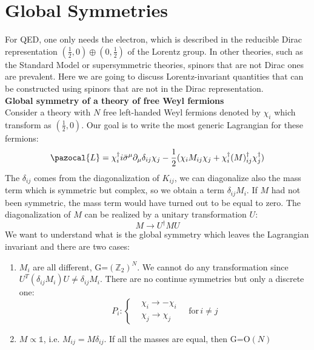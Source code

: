 \documentclass[../main.tex]{subfiles}
\begin{document}
\section{Global Symmetries}
For QED, one only needs the electron, which is described in the reducible Dirac representation $\left(\frac{1}{2},0\right)\oplus\left(0,\frac{1}{2}\right)$ of the Lorentz group. In other theories, such as the Standard Model or supersymmetric theories, spinors that are not Dirac ones are prevalent. Here we are going to discuss Lorentz-invariant quantities that can be constructed using spinors that are not in the Dirac representation.\\
\textbf{Global symmetry of a theory of free Weyl fermions}\\
Consider a theory with $N$ free left-handed Weyl fermions denoted by $\chi_i$ which transform as $\left(\frac{1}{2},0\right)$. Our goal is to write the most generic Lagrangian for these fermions:
\[
\pazocal{L}=\chi_i^\dagger i\bar{\sigma}^\mu\partial_\mu \delta_{ij}\chi_j-\frac{1}{2}(\chi_i M_{ij}\chi_j+\chi_i^\dagger(M)_{ij}^\dagger\chi_j^\dagger)
\]
The $\delta_{ij}$ comes from the diagonalization of $K_{ij}$, we can diagonalize also the mass term which is symmetric but complex, so we obtain a term $\delta_{ij}M_i$. If $M$ had not been symmetric, the mass term would have turned out to be equal to zero. The diagonalization of $M$ can be realized by a unitary transformation $U$:
\[
M\to U^\dagger MU
\]
We want to understand what is the global symmetry which leaves the Lagrangian invariant and there are two cases:
\begin{enumerate}
    \item $M_i$ are all different, G=$(\mathbb{Z}_2)^N$. We cannot do any transformation since $U^T(\delta_{ij}M_i)U\neq\delta_{ij}M_i$. There are no continue symmetries but only a discrete one:
    \[
    P_i:
    \left\{
    \begin{aligned}
    &\chi_i\to-\chi_i\\
    &\chi_j\to\chi_j
    \end{aligned}
    \quad
    \text{for}\,i\neq j
    \right.
    \]
    \item $M\propto\mathbb{1}$, i.e. $M_{ij}=M\delta_{ij}$. If all the masses are equal, then G=O$(N)$
\end{enumerate}
\end{document}
